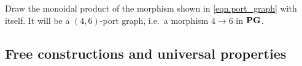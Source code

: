 \documentclass[7Sketches]{subfiles}
\begin{document}
%
%
%
%

\begin{exercise}%
\label{exc.mon_prod_of_morphisms}
Draw the monoidal product of the morphism shown in \cref{eqn.port_graph} with itself. It will be a $(4,6)$-port graph, i.e.\ a morphism $4\to 6$ in $\mathbf{PG}$.
\end{exercise}

%

\subsection{Free constructions and universal properties}%
\label{sec.free_constructions}
\end{document}
